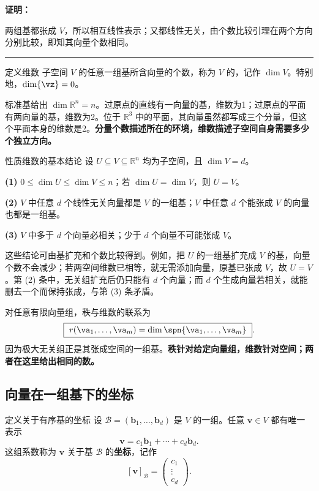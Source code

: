 \documentclass[a4paper,12pt,twoside,openany,fontset=none]{ctexbook}
\renewcommand{\le}{\leqslant}
\newenvironment{property}[1][]{\begin{thmBox}{性质}{#1}}{\end{thmBox}}
\newcounter{definition}[chapter]
\newenvironment{definition}[1][]{\begin{defBox}{定义}{#1}}{\end{defBox}}
\renewenvironment{proof}{
    \par\vspace{0.5em}\noindent
    \textbf{\color{LogicColor} 证明：}
}{
    \hfill \textcolor{LogicColor}{\rule{0.6em}{0.6em}} \par
}
\numberwithin{equation}{chapter}
\begin{document}
\begin{proof}
两组基都张成 $V$，所以相互线性表示；又都线性无关，由个数比较引理在两个方向分别比较，即知其向量个数相同。
\end{proof}

\begin{definition}[维数]
子空间 $V$ 的任意一组基所含向量的个数，称为 $V$ 的\textbf{}，记作 $\dim V$。特别地，\mbox{$\dim\{\vz\}=0$}。
\end{definition}

标准基给出 $\dim\mathbb{R}^n=n$。过原点的直线有一向量的基，维数为1；过原点的平面有两向量的基，维数为2。位于 $\mathbb{R}^3$ 中的平面，其向量虽然都写成三个分量，但这个平面本身的维数是2。\textbf{分量个数描述所在的环境，维数描述子空间自身需要多少个独立方向。}

\begin{property}[维数的基本结论]
设 $U\subseteq V\subseteq\mathbb{R}^n$ 均为子空间，且 $\dim V=d$。

\textbf{(1)} $0\le\dim U\le\dim V\le n$；若 $\dim U=\dim V$，则 $U=V$。

\textbf{(2)} $V$ 中任意 $d$ 个线性无关向量都是 $V$ 的一组基；$V$ 中任意 $d$ 个能张成 $V$ 的向量也都是一组基。

\textbf{(3)} $V$ 中多于 $d$ 个向量必相关；少于 $d$ 个向量不可能张成 $V$。
\end{property}

这些结论可由基扩充和个数比较得到。例如，把 $U$ 的一组基扩充成 $V$ 的基，向量个数不会减少；若两空间维数已相等，就无需添加向量，原基已张成 $V$，故 $U=V$。第 (2) 条中，无关组扩充后仍只能有 $d$ 个向量；而 $d$ 个生成向量若相关，就能删去一个而保持张成，与第 (3) 条矛盾。

对任意有限向量组，秩与维数的联系为
\[
    \boxed{\ r(\va_1,\ldots,\va_m)
    =\dim\spn\{\va_1,\ldots,\va_m\}\ }.
\]
因为极大无关组正是其张成空间的一组基。\textbf{秩针对给定向量组，维数针对空间；两者在这里给出相同的数。}

\subsection*{向量在一组基下的坐标}

\begin{definition}[关于有序基的坐标]
设 $\mathcal{B}=(\boldsymbol{b}_1,\ldots,\boldsymbol{b}_d)$ 是 $V$ 的一组。任意 $\boldsymbol{v}\in V$ 都有唯一表示
\[
    \boldsymbol{v}=c_1\boldsymbol{b}_1+\cdots+c_d\boldsymbol{b}_d.
\]
这组系数称为 $\boldsymbol{v}$ 关于基 $\mathcal{B}$ 的\textbf{坐标}，记作
\[
    [\boldsymbol{v}]_{\mathcal{B}}
    =\left(\begin{array}{c}c_1\\\vdots\\c_d\end{array}\right).
\]
\end{definition}
\end{document}
